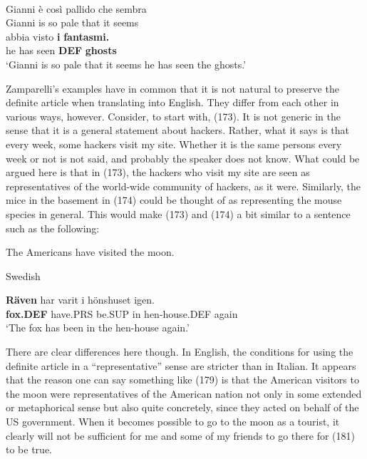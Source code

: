 \z

\ea \label{} 
\\
	\gll Gianni  è  così  pallido  che  sembra\\
Gianni  is  so  pale  that  it seems\\
\gll abbia  visto  \textbf{i} \textbf{fantasmi.}   \\
he has  seen  \textbf{DEF} \textbf{ghosts}   \\
\glt ‘Gianni is so pale that it seems he has seen the ghosts.’

\z

Zamparelli’s examples have in common that it is not natural to preserve the definite article when translating into English. They differ from each other in various ways, however. Consider, to start with, (173). It is not generic in the sense that it is a general statement about hackers. Rather, what it says is that every week, some hackers visit my site. Whether it is the same persons every week or not is not said, and probably the speaker does not know. What could be argued here is that in (173), the hackers who visit my site are seen as representatives of the world-wide community of hackers, as it were. Similarly, the mice in the basement in (174) could be thought of as representing the mouse species in general. This would make (173) and (174) a bit similar to a sentence such as the following: 

\ea
	\gl \label{bkm:Ref69031158}The Americans have visited the moon.  
\z

\ea 
\gl \label{bkm:Ref77501116}Swedish
\z
 
\ea\label{}
\gll \textbf{Räven} har  varit  i  hönshuset  igen.\\
\textbf{fox.DEF} have.PRS  be.SUP  in  hen-house.DEF  again\\
\glt ‘The fox has been in the hen-house again.’

\z

There are clear differences here though. In English, the conditions for using the definite article in a “representative” sense are stricter than in Italian. It appears that the reason one can say something like (179) is that the American visitors to the moon were representatives of the American nation not only in some extended or metaphorical sense but also quite concretely, since they acted on behalf of the US government. When it becomes possible to go to the moon as a tourist, it clearly will not be sufficient for me and some of my friends to go there for (181) to be true.

